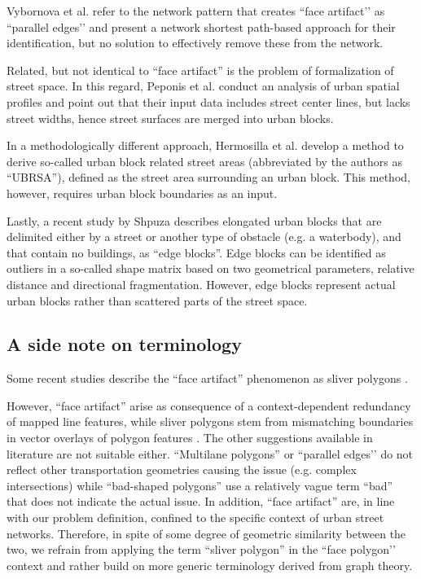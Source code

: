 Vybornova et al. \cite{vybornova_automated_2022} refer to the network pattern that
creates ``face artifact’’ as ``parallel edges’’ and present a network shortest
path-based approach for their identification, but no solution to effectively remove
these from the network.

Related, but not identical to ``face artifact'' is the problem of formalization of
street space. In this regard, Peponis et al. \cite{peponis_measuring_2007} conduct an
analysis of urban spatial profiles and point out that their input data includes street
center lines, but lacks street widths, hence street surfaces are merged into urban
blocks.

In a methodologically different approach, Hermosilla et al. \cite{hermosilla_using_2014}
develop a method to derive so-called urban block related street areas (abbreviated by
the authors as ``UBRSA''), defined as the street area surrounding an urban block. This
method, however, requires urban block boundaries as an input.

Lastly, a recent study by Shpuza \cite{shpuza_shape_2022} describes elongated urban
blocks that are delimited either by a street or another type of obstacle (e.g. a
waterbody), and that contain no buildings, as ``edge blocks''. Edge blocks can be
identified as outliers in a so-called shape matrix based on two geometrical parameters,
relative distance and directional fragmentation. However, edge blocks represent actual
urban blocks rather than scattered parts of the street space.

\subsection*{A side note on terminology}

Some recent studies describe the ``face artifact'' phenomenon as sliver polygons
\cite{grippa_mapping_2018, sanzana_decomposition_2018, ludwig_mapping_2021}.

However, ``face artifact'' arise as consequence of a context-dependent redundancy of
mapped line features, while sliver polygons stem from mismatching boundaries in vector
overlays of polygon features \cite{goodchild_statistical_1978, fischer_using_1993,
delafontaine_assessment_2009}. The other suggestions available in literature are not
suitable either. ``Multilane polygons'' \cite{li_polygon-based_2014} or ``parallel
edges’’ \cite{vybornova_automated_2022} do not reflect other transportation geometries
causing the issue (e.g. complex intersections) while ``bad-shaped polygons'' use a
relatively vague term ``bad'' that does not indicate the actual issue. In addition,
``face artifact'' are, in line with our problem definition, confined to the specific
context of urban street networks. Therefore, in spite of some degree of geometric
similarity between the two, we refrain from applying the term ``sliver polygon'' in the
``face polygon’’ context and rather build on more generic terminology derived from graph
theory.

